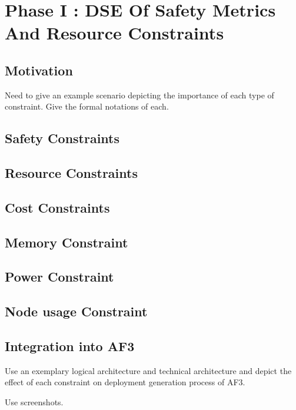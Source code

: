 \chapter{Phase I : DSE Of Safety Metrics And Resource Constraints}\label{chapter:constraints}

\section{Motivation}

Need to give an example scenario depicting the importance of each type of constraint. Give the formal notations of each.

\section{Safety Constraints}

\section{Resource Constraints}

\section{Cost Constraints}

\section{Memory Constraint}

\section{Power Constraint}

\section{Node usage Constraint}

\section{Integration into AF3}

Use an exemplary logical architecture and technical architecture and depict the effect of each constraint on deployment generation process of AF3.

Use screenshots. 


